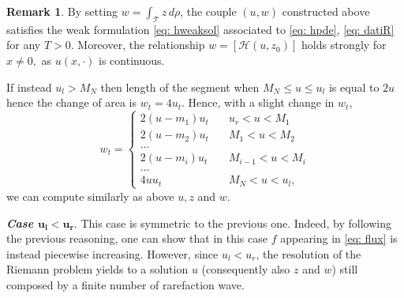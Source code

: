 \documentclass[12pt]{article}
\newcommand{\HM}{\mathcal{H}}
\newcommand{\T}{\mathcal{T}}
\newcommand{\p}{\rho}
\newcommand{\1}{\mathds{1}}
\theoremstyle{definition}
\newtheorem{rmk}[teo]{Remark}
\begin{document}
\begin{rmk}
    By setting $ w = \int_\T z\,d\p$, the couple $(u,w)$ constructed above satisfies the weak formulation \eqref{eq: hweaksol} associated to \eqref{eq: hpde}, \eqref{eq: datiR} for any $T>0$. Moreover, the relationship $w = [\HM(u,z_0)]$ holds strongly for $x\not=0,$ as $u(x,\cdot)$ is continuous.
\end{rmk}

If instead $u_l>M_N$ then length of the segment when $M_N\leq u\leq u_l$ is equal to $2u$ hence the change of area is $w_t=4u_t$. Hence, with a slight change in $w_t$, 
\begin{equation}
    w_t = \begin{cases}
        2(u-m_1) u_t &\quad u_r < u < M_{1}\\
        2(u-m_2) u_t &\quad M_1 < u < M_2 \\
        \dots \\
        2(u-m_i)u_t &\quad M_{i-1} < u< M_i \\
        \dots \\
        4uu_t &\quad M_{N} < u < u_l,
    \end{cases}
\end{equation} we can compute similarly as above $u,z$ and $w$. 

\textbf{\textit{Case $\mathbf{u_l<u_r}$}}. This case is symmetric to the previous one. Indeed, by following the previous reasoning, one can show that in this case $f$ appearing in \eqref{eq: flux} is instead piecewise increasing. However, since $u_l<u_r$, the resolution of the Riemann problem yields to a solution $u$ (consequently also $z$ and $w$) still composed by a finite number of rarefaction wave.
\end{document}

